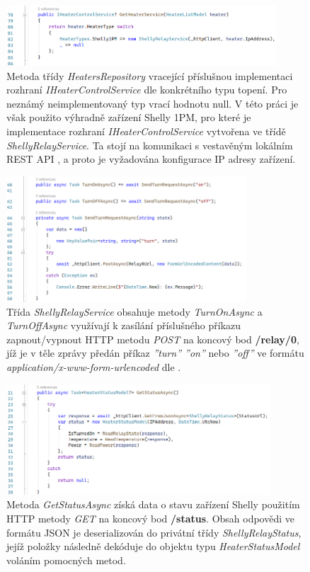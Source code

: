 \begin{figure}[hbt]
\includegraphics[width=0.9\textwidth]{obrazky-figures/code-heaterservice-decode.png}
\caption{Metoda třídy {\it HeatersRepository} vracející příslušnou implementaci rozhraní {\it IHeaterControlService} dle konkrétního typu topení. Pro neznámý neimplementovaný typ vrací hodnotu null. V této práci je však použito výhradně zařízení Shelly 1PM, pro které je implementace rozhraní {\it IHeaterControlService} vytvořena ve třídě {\it ShellyRelayService}. Ta stojí na komunikaci s vestavěným lokálním REST API \cite{shelly_api}, a proto je vyžadována konfigurace IP adresy zařízení.}
\end{figure}

\pagebreak

\begin{figure}[hbt]
\includegraphics[width=0.8\textwidth]{obrazky-figures/code-shellyturns.png}
\caption{Třída {\it ShellyRelayService} obsahuje metody {\it TurnOnAsync} a {\it TurnOffAsync} využívají k zasílání příslušného příkazu zapnout/vypnout HTTP metodu {\it POST} na koncový bod \textbf{/relay/0}, jíž je v těle zprávy předán příkaz {\it ''turn'' ''on''} nebo {\it ''off''} ve formátu {\it application/x-www-form-urlencoded} dle \cite{shelly_http}.}
\end{figure}

\begin{figure}[hbt]
\includegraphics[width=0.88\textwidth]{obrazky-figures/code-shelly-status.png}
\caption{Metoda {\it GetStatusAsync} získá data o stavu zařízení Shelly použitím HTTP metody {\it GET} na koncový bod \textbf{/status}. Obsah odpovědi ve formátu JSON je deserializován do privátní třídy {\it ShellyRelayStatus}, jejíž položky následně dekóduje do objektu typu {\it HeaterStatusModel} voláním pomocných metod.}
\end{figure}

